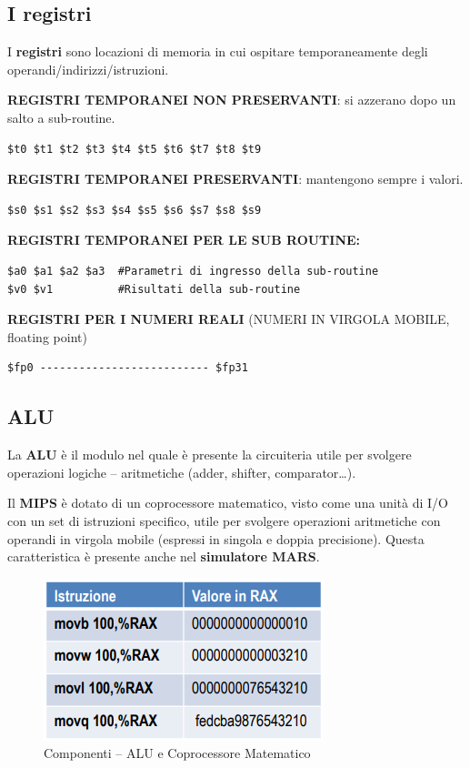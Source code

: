 \documentclass[12pt]{article}
\begin{document}
\subsection{I registri}
I \textbf{registri} sono locazioni di memoria in cui ospitare temporaneamente degli operandi/indirizzi/istruzioni.\par\medskip\noindent
\textbf{REGISTRI TEMPORANEI NON PRESERVANTI}: si azzerano dopo un salto a sub-routine.
\begin{lstlisting}
$t0 $t1 $t2 $t3 $t4 $t5 $t6 $t7 $t8 $t9
\end{lstlisting}
\vspace{\baselineskip}
\textbf{REGISTRI TEMPORANEI PRESERVANTI}: mantengono sempre i valori.
\begin{lstlisting}
$s0 $s1 $s2 $s3 $s4 $s5 $s6 $s7 $s8 $s9
\end{lstlisting}
\newpage
\noindent \textbf{REGISTRI TEMPORANEI PER LE SUB ROUTINE:}
\begin{lstlisting}
$a0 $a1 $a2 $a3  #Parametri di ingresso della sub-routine
$v0 $v1          #Risultati della sub-routine
\end{lstlisting}
\vspace{\baselineskip}
\textbf{REGISTRI PER I NUMERI REALI} (NUMERI IN VIRGOLA MOBILE, floating point)
\begin{lstlisting}
$fp0 -------------------------- $fp31
\end{lstlisting}
\vspace{\baselineskip}
\subsection{ALU}
La \textbf{ALU} è il modulo nel quale è presente la circuiteria utile per svolgere operazioni logiche – aritmetiche (adder, shifter, comparator…).\par\medskip\noindent
Il \textbf{MIPS} è dotato di un coprocessore matematico, visto come una unità di I/O con un set di istruzioni specifico, utile per svolgere operazioni aritmetiche con operandi in virgola mobile (espressi in singola e doppia precisione). Questa caratteristica è presente anche nel \textbf{simulatore MARS}.\par\medskip\noindent
\begin{figure}[h]
\centering
\includegraphics[width=0.75\linewidth]{image.png}
\caption{Componenti – ALU e Coprocessore Matematico}
\label{fig:enter-label}
\end{figure}
\newpage
\end{document}
